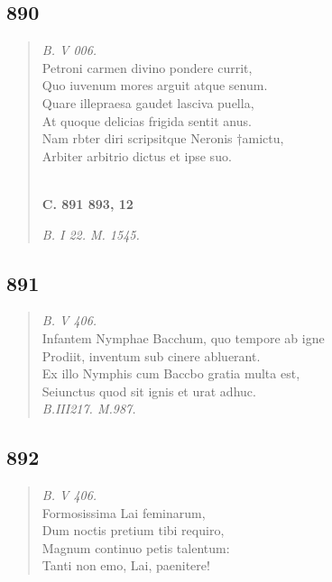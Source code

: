 \documentclass[11pt, a4paper]{report}
\begin{document}
            \subsection*{890}
      \begin{verse}
      \textit{B. V 006.} \\ Petroni carmen divino pondere currit, \\ Quo iuvenum mores arguit atque senum. \\ Quare illepraesa gaudet lasciva puella, \\ At quoque delicias frigida sentit anus. \\ Nam rbter diri scripsitque Neronis †amictu, \\ Arbiter arbitrio dictus et ipse suo. \\ 
        ﻿\pagebreak 
     \marginpar{[334]} \begin{center} \textbf{C. 891 893, 12} \end{center}\textit{B. I 22. M. 1545.} \\ 
      \end{verse}
  
            \subsection*{891}
      \begin{verse}
      \textit{B. V 406.} \\ Infantem Nymphae Bacchum, quo tempore ab igne \\ Prodiit, inventum sub cinere abluerant. \\ Ex illo Nymphis cum Baccbo gratia multa est, \\ Seiunctus quod sit ignis et urat adhuc. \\ \textit{B.III217. M.987.} \\ 
      \end{verse}
  
            \subsection*{892}
      \begin{verse}
      \textit{B. V 406.} \\ Formosissima Lai feminarum, \\ Dum noctis pretium tibi requiro, \\ Magnum continuo petis talentum: \\ Tanti non emo, Lai, paenitere! \\ 
      \end{verse}
  
\end{document}
